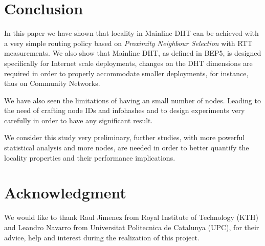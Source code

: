 \documentclass[conference]{IEEEtran}
\begin{document}
\section{Conclusion}
In this paper we have shown that locality in Mainline DHT can be achieved with a very simple routing policy based on \textit{Proximity Neighbour Selection} with RTT measurements. We also show that Mainline DHT, as defined in BEP5, is designed specifically for Internet scale deployments, changes on the DHT dimensions are required in order to properly accommodate smaller deployments, for instance, thus on Community Networks.

We have also seen the limitations of having an small number of nodes. Leading to the need of crafting node IDs and infohashes and to design experiments very carefully in order to have any significant result.

We consider this study very preliminary, further studies, with more powerful statistical analysis and more nodes, are needed in order to better quantify the locality properties and their performance implications.

\section*{Acknowledgment}


We would like to thank Raul Jimenez from Royal Institute of Technology (KTH) and
Leandro Navarro from Universitat Politecnica de Catalunya (UPC), for their advice, help and interest during the realization of this project.


\ifCLASSOPTIONcaptionsoff
  \newpage
\fi




\end{document}
